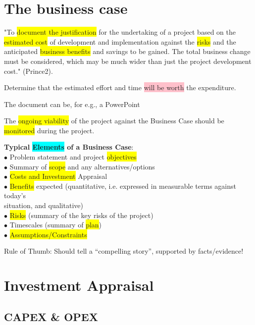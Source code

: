 \documentclass[]{project_plan}
\newcommand{\bulletPoint}{\hspace{-3.1pt}$\bullet$ \hspace{5pt}}
\begin{document}
\section{The business case}
"To \colorbox{yellow}{document the justification} for the undertaking of a project based on
the \colorbox{yellow}{estimated cost} of development and implementation against the \colorbox{yellow}{risks}
and the anticipated \colorbox{yellow}{business benefits} and savings to be gained. The total
business change must be considered, which may be much wider than just
the project development cost." (Prince2).

Determine that the estimated effort and time \colorbox{pink}{will be worth} the expenditure.

The document can be, for e.g., a PowerPoint

The \colorbox{yellow}{ongoing viability} of the project against the Business Case should be
\colorbox{yellow}{monitored} during the project.

\textbf{Typical \colorbox{cyan}{Elements} of a Business Case}:\\
\bulletPoint Problem statement and project \colorbox{yellow}{objectives}\\
\bulletPoint Summary of \colorbox{yellow}{scope} and any alternatives/options\\
\bulletPoint \colorbox{yellow}{Costs and Investment} Appraisal\\
\bulletPoint \colorbox{yellow}{Benefits} expected (quantitative, i.e. expressed in measurable terms against today’s\\
situation, and qualitative)\\
\bulletPoint \colorbox{yellow}{Risks} (summary of the key risks of the project)\\
\bulletPoint Timescales (summary of \colorbox{yellow}{plan})\\
\bulletPoint \colorbox{yellow}{Assumptions/Constraints}

Rule of Thumb: Should tell a “compelling story”, supported by facts/evidence!

\section{Investment Appraisal}

\subsection{CAPEX \& OPEX}
\end{document}
